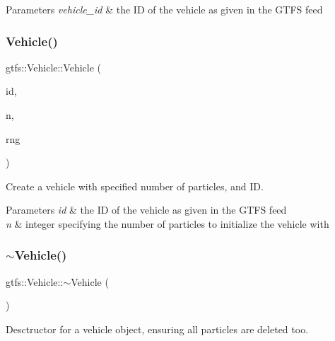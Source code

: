 \begin{DoxyParams}{Parameters}
{\em vehicle\+\_\+id} & the ID of the vehicle as given in the G\+T\+FS feed \\
\hline
\end{DoxyParams}
\mbox{\label{classgtfs_1_1Vehicle_a12765a61077b4be7e65ab67b63eb9fcc}} 
\subsubsection{\texorpdfstring{Vehicle()}{Vehicle()}\hspace{0.1cm}{\footnotesize\ttfamily [2/2]}}
{\footnotesize\ttfamily gtfs\+::\+Vehicle\+::\+Vehicle (\begin{DoxyParamCaption}\item[{std\+::string}]{id,  }\item[{unsigned int}]{n,  }\item[{\hyperlink{classsampling_1_1RNG}{sampling\+::\+R\+NG} \&}]{rng }\end{DoxyParamCaption})}

Create a vehicle with specified number of particles, and ID.


\begin{DoxyParams}{Parameters}
{\em id} & the ID of the vehicle as given in the G\+T\+FS feed \\
\hline
{\em n} & integer specifying the number of particles to initialize the vehicle with \\
\hline
\end{DoxyParams}
\mbox{\label{classgtfs_1_1Vehicle_a08c7450dd0df9406f78b30be044d27d8}} 
\subsubsection{\texorpdfstring{$\sim$\+Vehicle()}{~Vehicle()}}
{\footnotesize\ttfamily gtfs\+::\+Vehicle\+::$\sim$\+Vehicle (\begin{DoxyParamCaption}{ }\end{DoxyParamCaption})}

Desctructor for a vehicle object, ensuring all particles are deleted too. 

